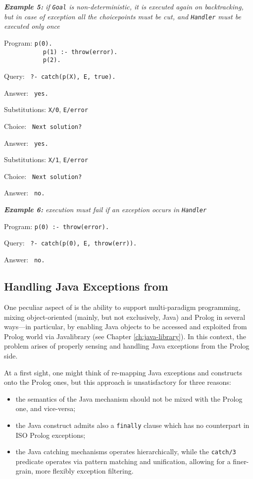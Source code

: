 \medskip\noindent
\textit{\textbf{Example 5:} if \texttt{Goal} is non-deterministic, it is executed again on backtracking, but in case of exception all the choicepoints must be cut, and \texttt{Handler} must be executed only once}

Program: \texttt{p(0).}\\
\mbox{\texttt{~~~~~~~~~~~}}\texttt{p(1) :- throw(error).}\\
\mbox{\texttt{~~~~~~~~~~~}}\texttt{p(2).}

Query: \texttt{ ?- catch(p(X), E, true).}

Answer: \texttt{ yes.}

Substitutions: \texttt{X/0}, \texttt{E/error}

Choice: \texttt{ Next solution?}

Answer: \texttt{ yes.}

Substitutions: \texttt{X/1}, \texttt{E/error}

Choice: \texttt{ Next solution?}

Answer: \texttt{ no.}


\medskip\noindent
\textit{\textbf{Example 6:} execution must fail if an exception occurs in \texttt{Handler}}

Program: \texttt{p(0) :- throw(error).}

Query: \texttt{ ?- catch(p(0), E, throw(err)).}

Answer: \texttt{ no.}

\subsection{Handling Java Exceptions from \tuprolog}
\label{ssec:java-exceptions-in-tuprolog}

One peculiar aspect of \tuprolog{} is the ability to support multi-paradigm programming, mixing object-oriented (mainly, but not exclusively, Java) and Prolog in several ways---in particular, by enabling Java objects to be accessed and exploited from Prolog world via Javalibrary (see Chapter \ref{ch:java-library}).
%
In this context, the problem arises of properly sensing and handling Java exceptions from the Prolog side.

At a first sight, one might think of re-mapping Java exceptions and constructs onto the Prolog ones, but this approach is unsatisfactory for three reasons:
%
\begin{itemize}
  \item the semantics of the Java mechanism should not be mixed with the Prolog one, and vice-versa;

  \item the Java construct admits also a \texttt{finally} clause which has no counterpart in ISO Prolog exceptions;

  \item the Java catching mechanisms operates hierarchically, while the \texttt{catch/3} predicate operates via pattern matching and unification, allowing for a finer-grain, more flexibly exception filtering.
\end{itemize}

